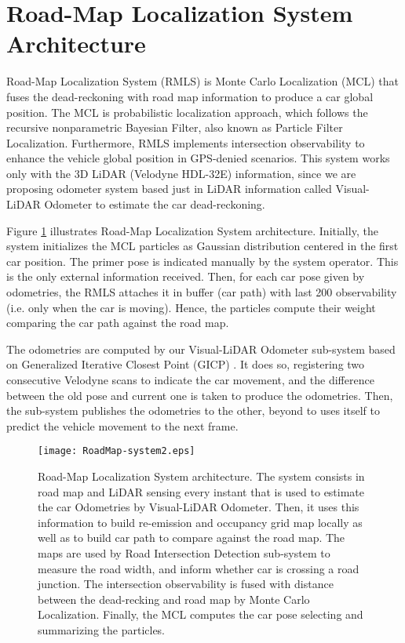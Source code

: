 \section{Road-Map Localization System Architecture}

Road-Map Localization System (RMLS) is Monte Carlo Localization (MCL) that fuses the dead-reckoning with road map information to produce a car global position. The MCL is probabilistic localization approach, which follows the recursive nonparametric Bayesian Filter, also known as Particle Filter Localization. Furthermore, RMLS implements intersection observability to enhance the vehicle global position in GPS-denied scenarios. This system works only with the 3D LiDAR (Velodyne HDL-32E) information, since we are proposing odometer system based just in LiDAR information called Visual-LiDAR Odometer to estimate the car dead-reckoning. 

Figure \ref{Fig::RoadMap-system} illustrates Road-Map Localization System architecture. Initially, the system initializes the MCL particles as Gaussian distribution centered in the first car position. The primer pose is indicated manually by the system operator. This is the only external information received. Then, for each car pose given by odometries, the RMLS attaches it in buffer (car path) with last 200 observability (i.e. only when the car is moving). Hence, the particles compute their weight comparing the car path against the road map. 

The odometries are computed by our Visual-LiDAR Odometer sub-system based on Generalized Iterative Closest Point (GICP) \cite{58segal2009generalized}. It does so, registering two consecutive Velodyne scans to indicate the car movement, and the difference between the old pose and current one is taken to produce the odometries. Then, the sub-system publishes the odometries to the other, beyond to uses itself to predict the vehicle movement to the next frame. 

 
\begin{figure}[t!]
    \centering
    \texttt{[image: RoadMap-system2.eps]}
    \caption{Road-Map Localization System architecture. The system consists in road map and LiDAR sensing every instant that is used to estimate the car Odometries by Visual-LiDAR Odometer. Then, it uses this information to build re-emission and occupancy grid map locally as well as to build car path to compare against the road map. The maps are used by Road Intersection Detection sub-system to measure the road width, and inform whether car is crossing a road junction. The intersection observability is fused with distance between the dead-recking and road map by Monte Carlo Localization. Finally, the MCL computes the car pose selecting and summarizing the particles.}
    \label{Fig::RoadMap-system}
\end{figure}


